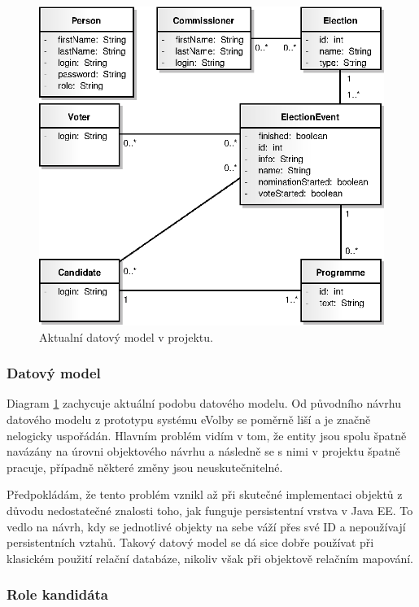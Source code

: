 \documentclass[11pt,twoside,a4paper]{book}
\begin{document}
\begin{figure}[!h]
	\centering
	\includegraphics[scale=0.9]{diagrams/tridy.eps}
	\caption{Aktualní datový model v projektu.}
	\label{fig:tridy}
\end{figure}

\subsubsection{Datový model} \label{sec:datovy_model}

Diagram \ref{fig:tridy} zachycuje aktuální podobu datového modelu. Od původního návrhu datového modelu z prototypu systému eVolby\cite{www:prototyp} se poměrně liší a je značně nelogicky uspořádán. Hlavním problém vidím v tom, že entity jsou spolu špatně navázány na úrovni objektového návrhu a následně se s nimi v projektu špatně pracuje, případně některé změny jsou neuskutečnitelné.

Předpokládám, že tento problém vznikl až při skutečné implementaci objektů z důvodu nedostatečné znalosti toho, jak funguje persistentní vrstva v Java EE. To vedlo na návrh, kdy se jednotlivé objekty na sebe váží přes své ID a nepoužívají persistentních vztahů. Takový datový model se dá sice dobře používat při klasickém použití relační databáze, nikoliv však při objektově relačním mapování.

\subsubsection{Role kandidáta}
\end{document}
